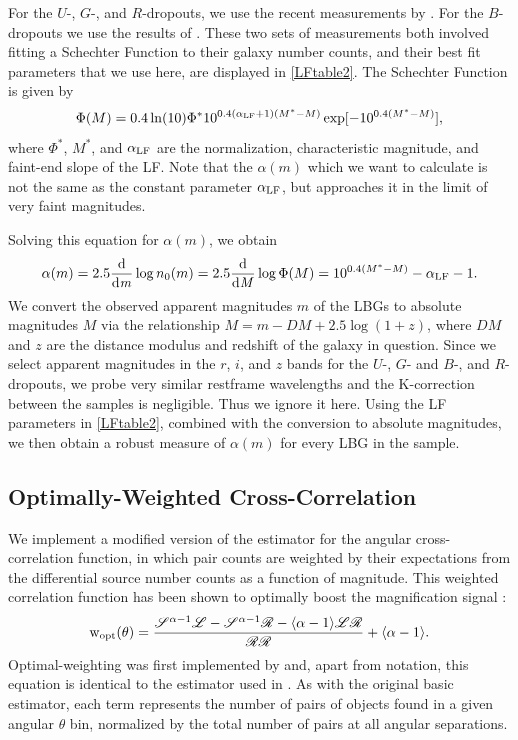 For the $U$-, $G$-, and $R$-dropouts, we use the recent measurements by \citet{vanderBurg10}. For the $B$-dropouts we use the results of \citet{Sawicki06}. These two sets of measurements both involved fitting a Schechter Function \citep{Schechter76} to their galaxy number counts, and their best fit parameters that we use here, are displayed in \autoref{LFtable2}.  The Schechter Function is given by
\begin{equation}
\Phi(M)=0.4\ln(10)\Phi^\ast10^{0.4(\alpha_{\rm LF}+1)(M^\ast-M)} \exp [-10^{0.4(M^\ast-M)}],
\end{equation}
where $\Phi^\ast$, $M^\ast$, and $\alpha_{\rm LF}$ are the normalization, characteristic magnitude, and faint-end slope of the \ac{LF}.  Note that the $\alpha(m)$ which we want to calculate is not the same as the constant parameter $\alpha_{\rm LF}$, but approaches it in the limit of very faint magnitudes.

Solving this equation for $\alpha(m)$, we obtain
\begin{equation}
\alpha(m) = 2.5 \frac{\mathrm d}{\mathrm d \it m} \log n_0(m)= 2.5 \frac{\mathrm d}{\mathrm d \it M} \log \Phi(M) = 10^{0.4(M^\ast-M)}-\alpha_{\rm LF}-1.
\end{equation}
We convert the observed apparent magnitudes $m$ of the \ac{LBG}s to absolute magnitudes $M$ via the relationship $M = m - DM + 2.5 \log (1+z)$, where $DM$ and $z$ are the distance modulus and redshift of the galaxy in question. Since we select apparent magnitudes in the $r$, $i$, and $z$ bands for the $U$-, $G$- and $B$-, and $R$-dropouts, we probe very similar restframe wavelengths and the K-correction between the samples is negligible.  Thus we ignore it here. Using the \ac{LF} parameters in \autoref{LFtable2}, combined with the conversion to absolute magnitudes, we then obtain a robust measure of $\alpha(m)$ for every \ac{LBG} in the sample. 

\subsection{Optimally-Weighted Cross-Correlation}
We implement a modified version of the \citet{LandySzalay93} estimator for the angular cross-correlation function, in which pair counts are weighted by their expectations from the differential source number counts as a function of magnitude.  This weighted correlation function has been shown to optimally boost the magnification signal \citep{Menard03}:    
\begin{equation}
\mathrm{w}_{\rm opt}(\theta)=\frac{\mathscr{S}^{\alpha-1} \mathscr{L} - \mathscr{S}^{\alpha-1} \mathscr{R} - \langle \alpha-1 \rangle \mathscr{L}\mathscr{R}}{\mathscr{R}\mathscr{R}} + \langle \alpha-1 \rangle .
\end{equation}
Optimal-weighting was first implemented by \citet{Scranton05} and, apart from notation, this equation is identical to the estimator used in \citet{Hildebrandt09b}.  As with the original basic estimator, each term represents the number of pairs of objects found in a given angular $\theta$ bin, normalized by the total number of pairs at all angular separations.  

